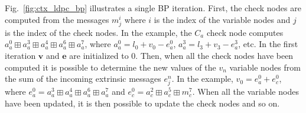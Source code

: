 Fig.~\ref{fig:ctx_ldpc_bp} illustrates a single BP iteration. First, the check
nodes are computed from the messages $m_j^i$ where $i$ is the index of the
variable nodes and $j$ is the index of the check nodes. In the example, the
$C_a$ check node computes $a^0_a \boxplus a^3_a \boxplus a^4_a \boxplus a^6_a
\boxplus a^7_a$, where $a^0_a = l_0 + v_0 - e^{0}_a$, $a^3_a = l_3 + v_3 -
e^{3}_a$, etc. In the first iteration $\bm{v}$ and $\bm{e}$ are initialized to
0. Then, when all the check nodes have been computed it is possible to
determine the new values of the $v_n$ variable nodes from the sum of the
incoming extrinsic messages $e_j^n$. In the example, $v_0 = e^0_a + e^0_c$,
where $e^0_a = a^3_a \boxplus a^4_a \boxplus a^6_a \boxplus a^7_a$ and $e^0_c =
a^2_c \boxplus a^5_c \boxplus m^7_c$. When all the variable nodes have been
updated, it is then possible to update the check nodes and so on.



